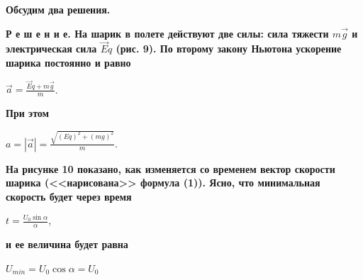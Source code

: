 \documentclass[a4paper,14pt]{article}
\begin{document}
\begin{multicols}{2}
        \textbf{Обсудим два решения.}
        
        \textbf{Р е ш е н и е. На шарик в полете действуют две силы: сила тяжести $m\vec{g}$ и электрическая сила $\vec{E}q$ (рис. 9). По второму закону Ньютона ускорение шарика постоянно и равно}
        
        $\vec{a} = \frac{\vec{E}q + m\vec{g}}{m}$. 
        
        \noindent\textbf{При этом}
        
        $a = |\vec{a}| = \frac{\sqrt{(Eq)^2 + (mg)^2}}{m}$. 
        
        \noindent\textbf{На рисунке 10 показано, как изменяется со временем вектор скорости шарика (<<нарисована>> формула (1)). Ясно, что минимальная скорость будет через время}
        
        $t = \frac{U_0\sin{\alpha}}{\alpha}$,
        
        \noindent\textbf{и ее величина будет равна}
        
        $U_{min} = U_0 \cos{\alpha} = U_0 \frac{}{}$
        
    \end{multicols}
    
\end{document}
